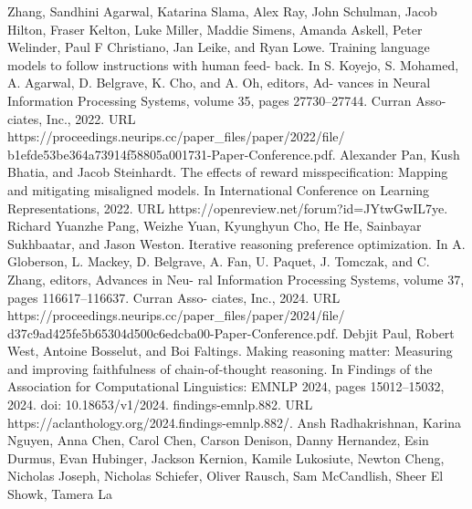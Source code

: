 Zhang, Sandhini Agarwal, Katarina Slama, Alex Ray, John Schulman, Jacob Hilton, Fraser
Kelton, Luke Miller, Maddie Simens, Amanda Askell, Peter Welinder, Paul F Christiano, Jan
Leike, and Ryan Lowe.
Training language models to follow instructions with human feed-
back. In S. Koyejo, S. Mohamed, A. Agarwal, D. Belgrave, K. Cho, and A. Oh, editors, Ad-
vances in Neural Information Processing Systems, volume 35, pages 27730–27744. Curran Asso-
ciates, Inc., 2022. URL https://proceedings.neurips.cc/paper\_files/paper/2022/file/
b1efde53be364a73914f58805a001731-Paper-Conference.pdf.
Alexander Pan, Kush Bhatia, and Jacob Steinhardt. The effects of reward misspecification: Mapping
and mitigating misaligned models. In International Conference on Learning Representations, 2022.
URL https://openreview.net/forum?id=JYtwGwIL7ye.
Richard Yuanzhe Pang, Weizhe Yuan, Kyunghyun Cho, He He, Sainbayar Sukhbaatar, and
Jason Weston.
Iterative reasoning preference optimization.
In A. Globerson, L. Mackey,
D. Belgrave, A. Fan, U. Paquet, J. Tomczak, and C. Zhang, editors, Advances in Neu-
ral Information Processing Systems, volume 37, pages 116617–116637. Curran Asso-
ciates, Inc., 2024. URL https://proceedings.neurips.cc/paper\_files/paper/2024/file/
d37c9ad425fe5b65304d500c6edcba00-Paper-Conference.pdf.
Debjit Paul, Robert West, Antoine Bosselut, and Boi Faltings. Making reasoning matter: Measuring
and improving faithfulness of chain-of-thought reasoning. In Findings of the Association for
Computational Linguistics: EMNLP 2024, pages 15012–15032, 2024. doi: 10.18653/v1/2024.
findings-emnlp.882. URL https://aclanthology.org/2024.findings-emnlp.882/.
Ansh Radhakrishnan, Karina Nguyen, Anna Chen, Carol Chen, Carson Denison, Danny Hernandez,
Esin Durmus, Evan Hubinger, Jackson Kernion, Kamile Lukosiute, Newton Cheng, Nicholas
Joseph, Nicholas Schiefer, Oliver Rausch, Sam McCandlish, Sheer El Showk, Tamera La

